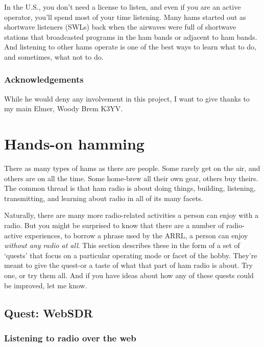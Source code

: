 \documentclass[
  letterpaper,
  DIV=11,
  numbers=noendperiod]{scrreport}
\begin{document}
In the U.S., you don't need a license to listen, and even if you are an
active operator, you'll spend most of your time listening. Many hams
started out as shortwave listeners (SWLs) back when the airwaves were
full of shortwave stations that broadcasted programs in the ham bands or
adjacent to ham bands. And listening to other hams operate is one of the
best ways to learn what to do, and sometimes, what not to do.

\hypertarget{acknowledgements}{%
\section{Acknowledgements}\label{acknowledgements}}

While he would deny any involvement in this project, I want to give
thanks to my main Elmer, Woody Brem K3YV.

\part{Hands-on hamming}

There as many types of hams as there are people. Some rarely get on the
air, and others are on all the time. Some home-brew all their own gear,
others buy theirs. The common thread is that ham radio is about doing
things, building, listening, transmitting, and learning about radio in
all of its many facets.

Naturally, there are many more radio-related activities a person can
enjoy with a radio. But you might be surprised to know that there are a
number of radio-active experiences, to borrow a phrase used by the ARRL,
a person can enjoy \emph{without any radio at all}. This section
describes these in the form of a set of `quests' that focus on a
particular operating mode or facet of the hobby. They're meant to give
the quest-or a taste of what that part of ham radio is about. Try one,
or try them all. And if you have ideas about how any of these quests
could be improved, let me know.

\hypertarget{quest-websdr}{%
\chapter*{Quest: WebSDR}\label{quest-websdr}}


\hypertarget{listening-to-radio-over-the-web}{%
\section*{Listening to radio over the
web}\label{listening-to-radio-over-the-web}}
\end{document}
